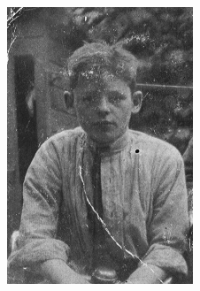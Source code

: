 \documentclass[12pt,twoside, openright]{memoir}
\begin{document}
\begin{figure}
\centering
\includegraphics[width=\textwidth]{img/JongeGeert}
\caption*{\footnotesize }
\end{figure}
\end{document}
